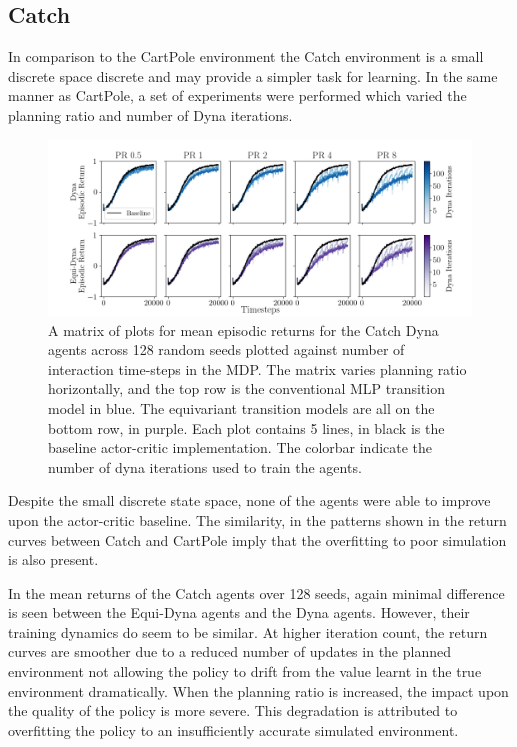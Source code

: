 \subsection{Catch}
In comparison to the CartPole environment the Catch environment is a small discrete space discrete and may provide a simpler task for learning.
In the same manner as CartPole, a set of experiments were performed which varied the planning ratio and number of Dyna iterations.
\begin{figure}[h!]
	\centering
	\includegraphics[width=\textwidth]{Figures/dyna_sweep_catch.png}
	\caption{A matrix of plots for mean episodic returns for the Catch Dyna agents across 128 random seeds
		plotted against number of interaction time-steps in the MDP. The matrix varies planning ratio horizontally, and the top row is the conventional MLP transition model in blue. The equivariant transition models are all on the bottom row, in purple. Each plot contains 5 lines, in black is the baseline actor-critic implementation. The colorbar indicate the number of dyna iterations used to train the agents.}
	\label{fig:catch_dyna}
\end{figure}
Despite the small discrete state space, none of the agents were able to improve upon the actor-critic baseline. The similarity, in the patterns shown in the return curves between Catch and CartPole imply that the overfitting to poor simulation is also present.

In the mean returns of the Catch agents over 128 seeds, again minimal difference is seen between the Equi-Dyna agents and the Dyna agents. However, their training dynamics do seem to be similar. At higher iteration count, the return curves are smoother due to a reduced number of updates in the planned environment not allowing the policy to drift from the value learnt in the true environment dramatically. When the planning ratio is increased, the impact upon the quality of the policy is more severe. This degradation is attributed to overfitting the policy to an insufficiently accurate simulated environment.

